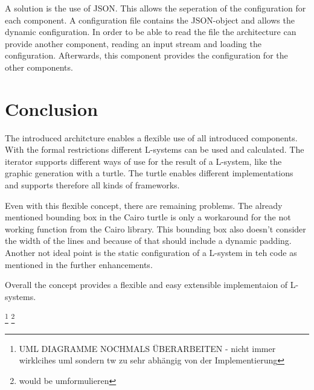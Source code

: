 \documentclass[english]{cpp-hmwk}
\begin{document}
A solution is the use of JSON. This allows the seperation of the configuration for each component. A configuration file contains the JSON-object and allows the dynamic configuration. In order to be able to read the file the architecture can provide another component, reading an input stream and loading the configuration. Afterwards, this component provides the configuration for the other components.

\section{Conclusion}
The introduced architcture enables a flexible use of all introduced components. With the formal restrictions different L-systems can be used and calculated. The iterator supports different ways of use for the result of a L-system, like the graphic generation with a turtle. The turtle enables different implementations and supports therefore all kinds of frameworks. 

\noindent Even with this flexible concept, there are remaining problems. The already mentioned bounding box in the Cairo turtle is only a workaround for the not working function from the Cairo library. This bounding box also doesn't consider the width of the lines and because of that should include a dynamic padding. Another not ideal point is the static configuration of a L-system in teh code as mentioned in the further enhancements. 

\noindent Overall the concept provides a flexible and easy extensible implementaion of L-systems.

\footnote{UML DIAGRAMME NOCHMALS ÜBERARBEITEN - nicht immer wirklcihes uml sondern tw zu sehr abhängig von der Implementierung}
\footnote{would be umformulieren}

\pagebreak
\printbibliography
\end{document}
